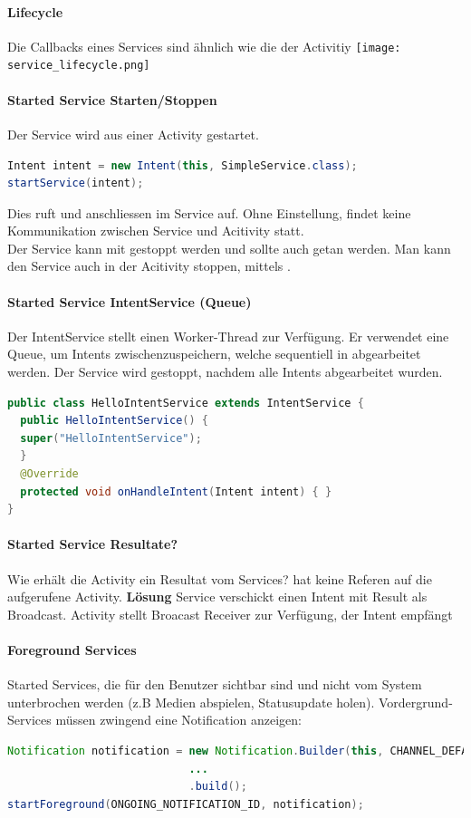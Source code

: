 \paragraph{Lifecycle} Die Callbacks eines Services sind ähnlich wie die der Activitiy
\texttt{[image: service\_lifecycle.png]}
\paragraph{Started Service Starten/Stoppen} Der Service wird aus einer Activity gestartet.
\begin{lstlisting}[language=java]
Intent intent = new Intent(this, SimpleService.class);
startService(intent);
\end{lstlisting}
Dies ruft  und anschliessen  im Service auf. Ohne Einstellung, findet keine Kommunikation zwischen Service und Acitivity statt.\\
Der Service kann mit  gestoppt werden und sollte auch getan werden. Man kann den Service auch in der Acitivity stoppen, mittels .
\paragraph{Started Service IntentService (Queue)} Der IntentService stellt einen Worker-Thread zur Verfügung. Er verwendet eine Queue, um Intents zwischenzuspeichern, welche sequentiell in  abgearbeitet werden. Der Service wird gestoppt, nachdem alle Intents abgearbeitet wurden.
\begin{lstlisting}[language=java]
public class HelloIntentService extends IntentService {
  public HelloIntentService() {
  super("HelloIntentService");
  }
  @Override
  protected void onHandleIntent(Intent intent) { }
}
\end{lstlisting}
\paragraph{Started Service Resultate?}
Wie erhält die Activity ein Resultat vom Services?  hat keine Referen auf die aufgerufene Activity. \textbf{Lösung} Service verschickt einen Intent mit Result als Broadcast. Activity stellt Broacast Receiver zur Verfügung, der Intent empfängt
\paragraph{Foreground Services }
Started Services, die für den Benutzer sichtbar sind und nicht vom System unterbrochen werden (z.B Medien abspielen, Statusupdate holen). Vordergrund-Services müssen zwingend eine Notification anzeigen:
\begin{lstlisting}[language=java]
Notification notification = new Notification.Builder(this, CHANNEL_DEFAULT_IMPORTANCE)
                            ...
                            .build();
startForeground(ONGOING_NOTIFICATION_ID, notification); 
\end{lstlisting}

